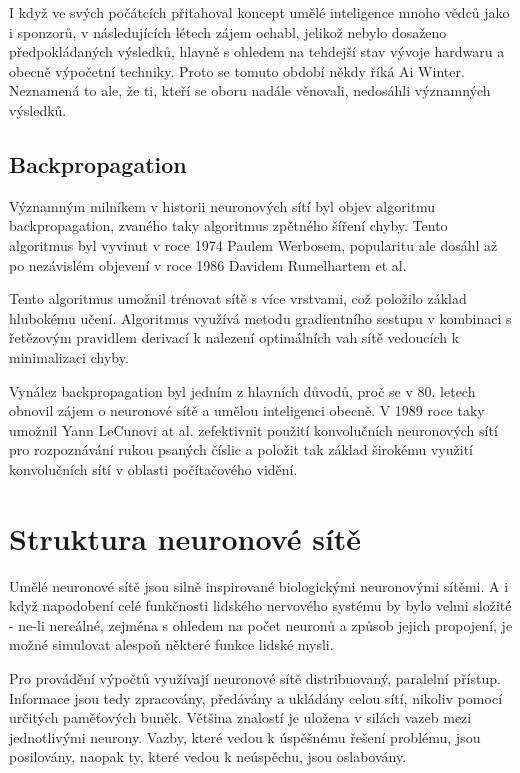 I když ve svých počátcích přitahoval koncept umělé inteligence mnoho vědců jako
i sponzorů, v následujících létech zájem ochabl, jelikož nebylo dosaženo
předpokládaných výsledků, hlavně s ohledem na tehdejší stav vývoje hardwaru a
obecně výpočetní techniky. Proto se tomuto období někdy říká Ai Winter.
Neznamená to ale, že ti, kteří se oboru nadále věnovali, nedosáhli významných
výsledků. \cite{nn_history}

\subsection{Backpropagation}
Významným milníkem v historii neuronových sítí byl objev algoritmu
backpropagation, zvaného taky algoritmus zpětného šíření chyby. Tento
algoritmus byl vyvinut v roce 1974 Paulem Werbosem, popularitu ale dosáhl až po
nezávislém objevení v roce 1986 Davidem Rumelhartem et al.
\cite{backpropagation}

Tento algoritmus umožnil trénovat sítě s více vrstvami, což položilo základ
hlubokému učení. Algoritmus využívá metodu gradientního sestupu v kombinaci s
řetězovým pravidlem derivací k nalezení optimálních vah sítě vedoucích k
minimalizaci chyby.

Vynález backpropagation byl jedním z hlavních důvodů, proč se v 80. letech
obnovil zájem o neuronové sítě a umělou inteligenci obecně. V 1989 roce taky
umožnil Yann LeCunovi at al. zefektivnit použití konvolučních neuronových sítí
pro rozpoznávání rukou psaných číslic \cite{lecun1989} a položit tak základ
širokému využití konvolučních sítí v oblasti počítačového vidění.

\section{Struktura neuronové sítě}

Umělé neuronové sítě jsou silně inspirované biologickými neuronovými sítěmi. A
i když napodobení celé funkčnosti lidského nervového systému by bylo velmi
složité - ne-li nereálné, zejména s ohledem na počet neuronů a způsob jejich
propojení, je možné simulovat alespoň některé funkce lidské mysli.

Pro provádění výpočtů využívají neuronové sítě distribuovaný, paralelní
přístup. Informace jsou tedy zpracovány, předávány a ukládány celou sítí,
nikoliv pomocí určitých paměťových buněk. Většina znalostí je uložena v silách
vazeb mezi jednotlivými neurony. Vazby, které vedou k úspěšnému řešení
problému, jsou posilovány, naopak ty, které vedou k neúspěchu, jsou oslabovány.

